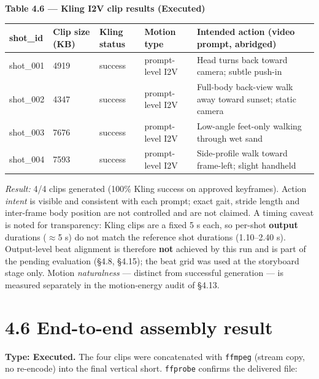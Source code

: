 \documentclass[10pt,twocolumn,letterpaper]{article}
\begin{document}
\begin{table}[t]
\centering
{\footnotesize\textbf{\textbf{Table 4.6 --- Kling I2V clip results (Executed)}}}\par\vspace{3pt}
\footnotesize
\begin{tabularx}{\textwidth}{lll>{\RaggedRight\arraybackslash}X>{\RaggedRight\arraybackslash}X}
\toprule
shot\_id & Clip size (KB) & Kling status & Motion type & Intended action (video prompt, abridged) \\
\midrule
shot\_001 & 4919 & success & prompt-level I2V & Head turns back toward camera; subtle push-in \\
shot\_002 & 4347 & success & prompt-level I2V & Full-body back-view walk away toward sunset; static camera \\
shot\_003 & 7676 & success & prompt-level I2V & Low-angle feet-only walking through wet sand \\
shot\_004 & 7593 & success & prompt-level I2V & Side-profile walk toward frame-left; slight handheld \\
\bottomrule
\end{tabularx}
\end{table}

\emph{Result:} 4/4 clips generated (100\% Kling success on approved keyframes). Action \emph{intent} is visible and consistent with each prompt; exact gait, stride length and inter-frame body position are not controlled and are not claimed. A timing caveat is noted for transparency: Kling clips are a fixed 5 s each, so per-shot \textbf{output} durations ($\approx$5 s) do not match the reference shot durations (1.10--2.40 s). Output-level beat alignment is therefore \textbf{not} achieved by this run and is part of the pending evaluation (\S{}4.8, \S{}4.15); the beat grid was used at the storyboard stage only. Motion \emph{naturalness} --- distinct from successful generation --- is measured separately in the motion-energy audit of \S{}4.13.


\section*{4.6 End-to-end assembly result}

\textbf{Type: Executed.} The four clips were concatenated with \texttt{ffmpeg} (stream copy, no re-encode) into the final vertical short. \texttt{ffprobe} confirms the delivered file:
\end{document}
